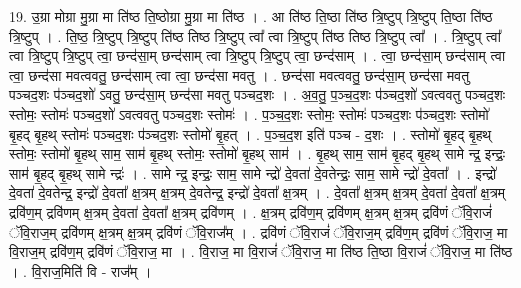 \documentclass[17pt]{extarticle}
\begin{document}
19. उ॒ग्रा मोग्रा मु॒ग्रा मा ति॑ष्ठ ति॒ष्ठोग्रा मु॒ग्रा मा ति॑ष्ठ । . आ ति॑ष्ठ ति॒ष्ठा ति॑ष्ठ त्रि॒ष्टुप् त्रि॒ष्टुप् ति॒ष्ठा ति॑ष्ठ त्रि॒ष्टुप् । . ति॒ष्ठ॒ त्रि॒ष्टुप् त्रि॒ष्टुप् ति॑ष्ठ तिष्ठ त्रि॒ष्टुप् त्वा᳚ त्वा त्रि॒ष्टुप् ति॑ष्ठ तिष्ठ त्रि॒ष्टुप् त्वा᳚ । . त्रि॒ष्टुप् त्वा᳚ त्वा त्रि॒ष्टुप् त्रि॒ष्टुप् त्वा॒ छन्द॑सा॒म् छन्द॑साम् त्वा त्रि॒ष्टुप् त्रि॒ष्टुप् त्वा॒ छन्द॑साम् । . त्वा॒ छन्द॑सा॒म् छन्द॑साम् त्वा त्वा॒ छन्द॑सा मवत्ववतु॒ छन्द॑साम् त्वा त्वा॒ छन्द॑सा मवतु । . छन्द॑सा मवत्ववतु॒ छन्द॑सा॒म् छन्द॑सा मवतु पञ्चद॒शः प॑ञ्चद॒शो॑ ऽवतु॒ छन्द॑सा॒म् छन्द॑सा मवतु पञ्चद॒शः । . अ॒व॒तु॒ प॒ञ्च॒द॒शः प॑ञ्चद॒शो॑ ऽवत्ववतु पञ्चद॒शः स्तोमः॒ स्तोमः॑ पञ्चद॒शो॑ ऽवत्ववतु पञ्चद॒शः स्तोमः॑ । . प॒ञ्च॒द॒शः स्तोमः॒ स्तोमः॑ पञ्चद॒शः प॑ञ्चद॒शः स्तोमो॑ बृ॒हद् बृ॒हथ् स्तोमः॑ पञ्चद॒शः प॑ञ्चद॒शः स्तोमो॑ बृ॒हत् । . प॒ञ्च॒द॒श इति॑ पञ्च - द॒शः । . स्तोमो॑ बृ॒हद् बृ॒हथ् स्तोमः॒ स्तोमो॑ बृ॒हथ् साम॒ साम॑ बृ॒हथ् स्तोमः॒ स्तोमो॑ बृ॒हथ् साम॑ । . बृ॒हथ् साम॒ साम॑ बृ॒हद् बृ॒हथ् सामे न्द्र॒ इन्द्रः॒ साम॑ बृ॒हद् बृ॒हथ् सामे न्द्रः॑ । . सामे न्द्र॒ इन्द्रः॒ साम॒ सामे न्द्रो॑ दे॒वता॑ दे॒वतेन्द्रः॒ साम॒ सामे न्द्रो॑ दे॒वता᳚ । . इन्द्रो॑ दे॒वता॑ दे॒वतेन्द्र॒ इन्द्रो॑ दे॒वता᳚ क्ष॒त्रम् क्ष॒त्रम् दे॒वतेन्द्र॒ इन्द्रो॑ दे॒वता᳚ क्ष॒त्रम् । . दे॒वता᳚ क्ष॒त्रम् क्ष॒त्रम् दे॒वता॑ दे॒वता᳚ क्ष॒त्रम् द्रवि॑ण॒म् द्रवि॑णम् क्ष॒त्रम् दे॒वता॑ दे॒वता᳚ क्ष॒त्रम् द्रवि॑णम् । . क्ष॒त्रम् द्रवि॑ण॒म् द्रवि॑णम् क्ष॒त्रम् क्ष॒त्रम् द्रवि॑णं ॅवि॒राजं॑ ॅवि॒राज॒म् द्रवि॑णम् क्ष॒त्रम् क्ष॒त्रम् द्रवि॑णं ॅवि॒राज᳚म् । . द्रवि॑णं ॅवि॒राजं॑ ॅवि॒राज॒म् द्रवि॑ण॒म् द्रवि॑णं ॅवि॒राज॒ मा वि॒राज॒म् द्रवि॑ण॒म् द्रवि॑णं ॅवि॒राज॒ मा । . वि॒राज॒ मा वि॒राजं॑ ॅवि॒राज॒ मा ति॑ष्ठ ति॒ष्ठा वि॒राजं॑ ॅवि॒राज॒ मा ति॑ष्ठ । . वि॒राज॒मिति॑ वि - राज᳚म् । \newline
\end{document}

